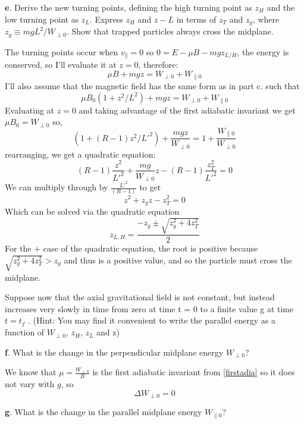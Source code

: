 \documentclass[12pt]{article}
\begin{document}
\vspace{3mm}

\noindent\textbf{e}. Derive the new turning points, defining the high turning point as $z_H$ and the low
turning point as $z_L$. Express $z_H$ and $z-L$ in terms of $z_T$ and $z_g$, where $z_g \equiv mgL^2
/W_{\perp 0}$.
Show that trapped particles always cross the midplane.

The turning points occur when $v_{\parallel}=0$ so $0=E-\mu B -mgz_{L/H}$, the energy is conserved, so I'll evaluate it at $z=0$, therefore:
$$\mu B+mgz=W_{\perp0}+W_{\parallel0}$$
I'll also assume that the magnetic field has the same form as in part c. such that
$$\mu B_0(1+z^2/L^2)+mgz=W_{\perp0}+W_{\parallel0}$$
Evaluating at $z=0$ and taking advantage of the first adiabatic invariant we get $\mu B_0=W_{\perp0}$ so,
$$(1+(R-1)z^2/L'^2)+\frac{mgz}{W_{\perp0}}=1+\frac{W_{\parallel0}}{W_{\perp0}}$$
rearranging, we get a quadratic equation:
$$(R-1)\frac{z^2}{L'^2}+\frac{mg}{W_{\perp0}}z-(R-1)\frac{z^2_T}{L'^2}=0$$
We can multiply through by $\frac{L'^2}{(R-1)}$ to get
$$z^2+z_gz-z_T^2=0$$
Which can be solved via the quadratic equation
$$\boxed{z_{L,H}=\frac{-z_g\pm\sqrt{z^2_g+4z_T^2}}{2}}$$ 
For the $+$ case of the quadratic equation, the root is positive because $\sqrt{z^2_g+4z^2_T}>z_g$ and thus is a positive value, and so the particle must cross the midplane.
\vspace{3mm}
 
\noindent Suppose now that the axial gravitational field is not constant, but instead increases
very slowly in time from zero at time t = 0 to a finite value g at time $t = t_f$ . (Hint: You
may find it convenient to write the parallel energy as a function of $W_{\perp 0}$, $z_H$, $z_L$ and z)
\vspace{3mm}

\noindent\textbf{f}. What is the change in the perpendicular midplane energy $W_{\perp 0}$?

We know that $\mu=\frac{W_{\perp0}}{B}$ is the first adiabatic invariant from \eqref{firstadia} so it does not vary with $g$, so 
$$\boxed{\Delta W_{\perp0}=0}$$
\vspace{3mm}

\noindent\textbf{g}. What is the change in the parallel midplane energy $W_{\parallel 0}$?
\end{document}
